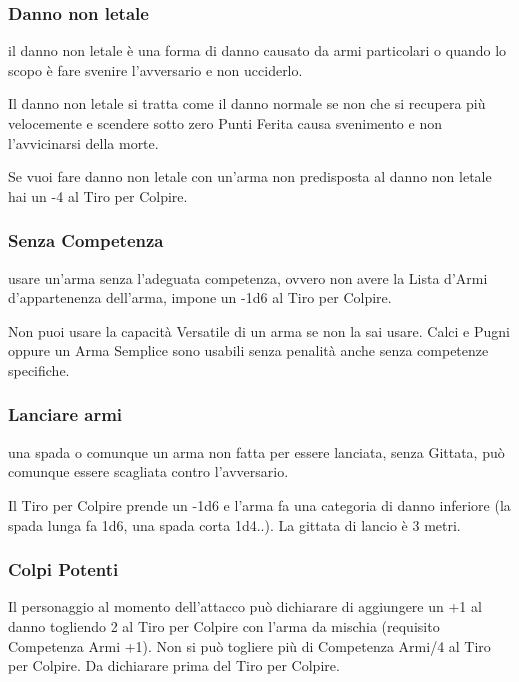\begin{multicols}{2}
\subsubsection{Danno non letale}\label{dannononletale}

il danno non letale è una forma di danno causato da armi particolari o quando lo scopo è fare svenire l'avversario e non ucciderlo.

Il danno non letale si tratta come il danno normale se non che si recupera più velocemente e scendere sotto zero Punti Ferita causa svenimento e non l'avvicinarsi della morte.

 \label{dannononletalearmanonidonea}

Se vuoi fare danno non letale con un'arma non predisposta al danno non letale hai un -4 al Tiro per Colpire.

\subsubsection{Senza Competenza}\label{senzacompetenza}

usare un'arma senza l'adeguata competenza, ovvero non avere la Lista d'Armi d'appartenenza dell'arma, impone un -1d6 al Tiro per Colpire.

Non puoi usare la capacità Versatile di un arma se non la sai usare. Calci e Pugni oppure un Arma Semplice sono usabili senza penalità anche senza competenze specifiche.

\subsubsection{Lanciare armi} \label{lanciarearmi}

una spada o comunque un arma non fatta per essere lanciata, senza Gittata, può comunque essere scagliata contro l'avversario.

Il Tiro per Colpire prende un -1d6 e l'arma fa una categoria di danno inferiore (la spada lunga fa 1d6, una spada corta 1d4..). La gittata di lancio è 3 metri.

\subsubsection{Colpi Potenti}\label{colpipotenti}

Il personaggio al momento dell'attacco può dichiarare di aggiungere un +1 al danno togliendo 2 al Tiro per Colpire con l'arma da mischia (requisito Competenza Armi +1). Non si può togliere più di Competenza Armi/4 al Tiro per Colpire. Da dichiarare prima del Tiro per Colpire.


\end{multicols}
